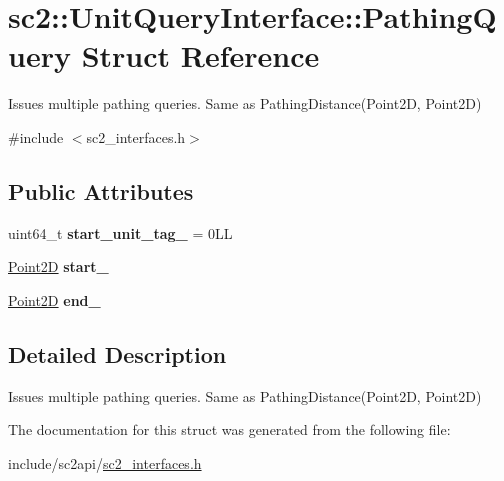 \hypertarget{structsc2_1_1_unit_query_interface_1_1_pathing_query}{}\section{sc2\+:\+:Unit\+Query\+Interface\+:\+:Pathing\+Query Struct Reference}
\label{structsc2_1_1_unit_query_interface_1_1_pathing_query}


Issues multiple pathing queries. Same as Pathing\+Distance(\+Point2\+D, Point2\+D)  




{\ttfamily \#include $<$sc2\+\_\+interfaces.\+h$>$}

\subsection*{Public Attributes}
\begin{DoxyCompactItemize}
\item 
\mbox{\label{structsc2_1_1_unit_query_interface_1_1_pathing_query_aae80c5ab43bdb4618a6e3c6d2a878c9c}} 
uint64\+\_\+t {\bfseries start\+\_\+unit\+\_\+tag\+\_\+} = 0\+LL
\item 
\mbox{\label{structsc2_1_1_unit_query_interface_1_1_pathing_query_a5c0ffe47e6cabab63b3f2bafc5aeeec0}} 
\hyperlink{structsc2_1_1_point2_d}{Point2D} {\bfseries start\+\_\+}
\item 
\mbox{\label{structsc2_1_1_unit_query_interface_1_1_pathing_query_ac90a021df1288853b751a58d52c9e379}} 
\hyperlink{structsc2_1_1_point2_d}{Point2D} {\bfseries end\+\_\+}
\end{DoxyCompactItemize}


\subsection{Detailed Description}
Issues multiple pathing queries. Same as Pathing\+Distance(\+Point2\+D, Point2\+D) 

The documentation for this struct was generated from the following file\+:\begin{DoxyCompactItemize}
\item 
include/sc2api/\hyperlink{sc2__interfaces_8h}{sc2\+\_\+interfaces.\+h}\end{DoxyCompactItemize}
